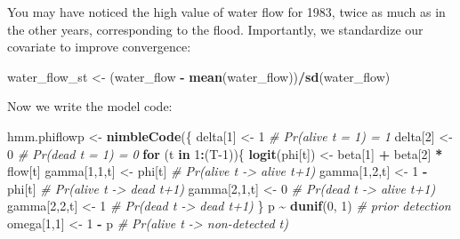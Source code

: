 \documentclass[
  12pt,
]{krantz}
\newenvironment{Shaded}{\begin{snugshade}}{\end{snugshade}}
\newcommand{\CommentTok}[1]{\textcolor[rgb]{0.56,0.35,0.01}{\textit{#1}}}
\newcommand{\ControlFlowTok}[1]{\textcolor[rgb]{0.13,0.29,0.53}{\textbf{#1}}}
\newcommand{\DecValTok}[1]{\textcolor[rgb]{0.00,0.00,0.81}{#1}}
\newcommand{\FunctionTok}[1]{\textcolor[rgb]{0.13,0.29,0.53}{\textbf{#1}}}
\newcommand{\NormalTok}[1]{#1}
\newcommand{\OtherTok}[1]{\textcolor[rgb]{0.56,0.35,0.01}{#1}}
\newcommand{\SpecialCharTok}[1]{\textcolor[rgb]{0.81,0.36,0.00}{\textbf{#1}}}
\begin{document}
You may have noticed the high value of water flow for 1983, twice as much as in the other years, corresponding to the flood. Importantly, we standardize our covariate to improve convergence:

\begin{Shaded}
\begin{Highlighting}[]
\NormalTok{water\_flow\_st }\OtherTok{\textless{}{-}}\NormalTok{ (water\_flow }\SpecialCharTok{{-}} \FunctionTok{mean}\NormalTok{(water\_flow))}\SpecialCharTok{/}\FunctionTok{sd}\NormalTok{(water\_flow)}
\end{Highlighting}
\end{Shaded}

Now we write the model code:

\begin{Shaded}
\begin{Highlighting}[]
\NormalTok{hmm.phiflowp }\OtherTok{\textless{}{-}} \FunctionTok{nimbleCode}\NormalTok{(\{}
\NormalTok{  delta[}\DecValTok{1}\NormalTok{] }\OtherTok{\textless{}{-}} \DecValTok{1}          \CommentTok{\# Pr(alive t = 1) = 1}
\NormalTok{  delta[}\DecValTok{2}\NormalTok{] }\OtherTok{\textless{}{-}} \DecValTok{0}          \CommentTok{\# Pr(dead t = 1) = 0}
  \ControlFlowTok{for}\NormalTok{ (t }\ControlFlowTok{in} \DecValTok{1}\SpecialCharTok{:}\NormalTok{(T}\DecValTok{{-}1}\NormalTok{))\{}
    \FunctionTok{logit}\NormalTok{(phi[t]) }\OtherTok{\textless{}{-}}\NormalTok{ beta[}\DecValTok{1}\NormalTok{] }\SpecialCharTok{+}\NormalTok{ beta[}\DecValTok{2}\NormalTok{] }\SpecialCharTok{*}\NormalTok{ flow[t] }
\NormalTok{    gamma[}\DecValTok{1}\NormalTok{,}\DecValTok{1}\NormalTok{,t] }\OtherTok{\textless{}{-}}\NormalTok{ phi[t]      }\CommentTok{\# Pr(alive t {-}\textgreater{} alive t+1)}
\NormalTok{    gamma[}\DecValTok{1}\NormalTok{,}\DecValTok{2}\NormalTok{,t] }\OtherTok{\textless{}{-}} \DecValTok{1} \SpecialCharTok{{-}}\NormalTok{ phi[t]  }\CommentTok{\# Pr(alive t {-}\textgreater{} dead t+1)}
\NormalTok{    gamma[}\DecValTok{2}\NormalTok{,}\DecValTok{1}\NormalTok{,t] }\OtherTok{\textless{}{-}} \DecValTok{0}        \CommentTok{\# Pr(dead t {-}\textgreater{} alive t+1)}
\NormalTok{    gamma[}\DecValTok{2}\NormalTok{,}\DecValTok{2}\NormalTok{,t] }\OtherTok{\textless{}{-}} \DecValTok{1}        \CommentTok{\# Pr(dead t {-}\textgreater{} dead t+1)}
\NormalTok{  \}}
\NormalTok{  p }\SpecialCharTok{\textasciitilde{}} \FunctionTok{dunif}\NormalTok{(}\DecValTok{0}\NormalTok{, }\DecValTok{1}\NormalTok{) }\CommentTok{\# prior detection}
\NormalTok{  omega[}\DecValTok{1}\NormalTok{,}\DecValTok{1}\NormalTok{] }\OtherTok{\textless{}{-}} \DecValTok{1} \SpecialCharTok{{-}}\NormalTok{ p    }\CommentTok{\# Pr(alive t {-}\textgreater{} non{-}detected t)}

\end{Highlighting}
\end{Shaded}
\end{document}

